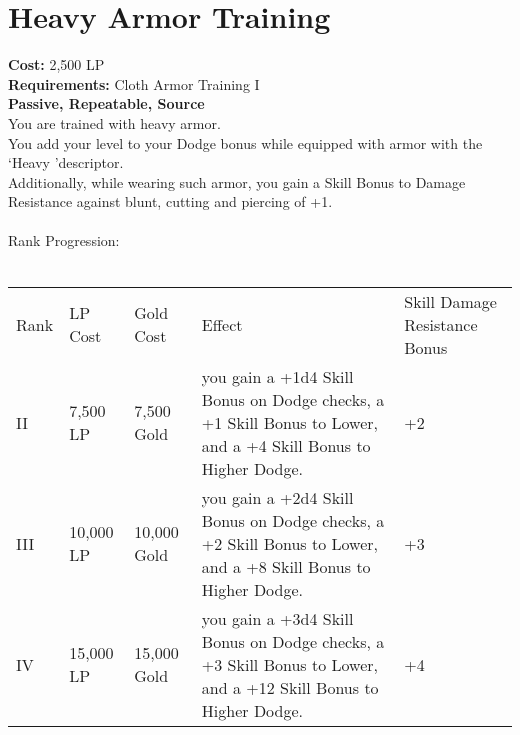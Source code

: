 \section{Heavy Armor Training}\label{perk:heavyArmorTraining}
\textbf{Cost:} 2,500 LP\\
\textbf{Requirements:} Cloth Armor Training I\\
\textbf{Passive, Repeatable, Source}\\
You are trained with heavy armor.\\
You add your level to your Dodge bonus while equipped with armor with the \lq Heavy \rq descriptor.\\
Additionally, while wearing such armor, you gain a Skill Bonus to Damage Resistance against blunt, cutting and piercing of +1.\\
\\

Rank Progression:\\
\\
\begin{longtable}{l | l | l | l | p{9cm}}
    Rank & LP Cost & Gold Cost & Effect & Skill Damage Resistance Bonus \\
    II
    & 7,500 LP
    & 7,500 Gold
    & you gain a +1d4 Skill Bonus on Dodge checks, a +1 Skill Bonus to Lower, and a +4 Skill Bonus to Higher Dodge.
    & +2
    \\
    III
    & 10,000 LP
    & 10,000 Gold
    & you gain a +2d4 Skill Bonus on Dodge checks, a +2 Skill Bonus to Lower, and a +8 Skill Bonus to Higher Dodge.
    & +3
    \\
    IV
    & 15,000 LP
    & 15,000 Gold
    & you gain a +3d4 Skill Bonus on Dodge checks, a +3 Skill Bonus to Lower, and a +12 Skill Bonus to Higher Dodge.
    & +4
    \\
\end{longtable}